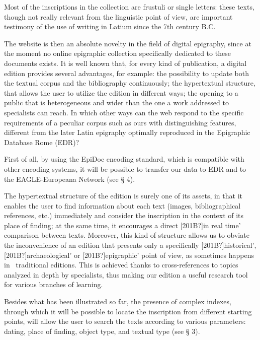 \documentclass[amsthm,ebook]{saparticle}
\begin{document}
Most of the inscriptions in the collection are frustuli or single letters: these texts, though not really relevant from
the linguistic point of view, are important testimony of the use of writing in Latium since the 7th century B.C. 

The website is then an absolute novelty in the field of digital epigraphy, since at the moment no online epigraphic
collection specifically dedicated to these documents exists. It is well known that, for every kind of publication, a
digital edition provides several advantages, for example: the possibility to update both the textual corpus and the
bibliography continuously; the hypertextual structure, that allows the user to utilize the edition in different ways;
the opening to a public that is heterogeneous and wider than the one a work addressed to specialists can reach. In
which other ways can the web respond to the specific requirements of a peculiar corpus such as ours with distinguishing
features, different from the later Latin epigraphy optimally reproduced in the Epigraphic Database Rome (EDR)?

First of all, by using the EpiDoc encoding standard, which is compatible with other encoding systems, it will be
possible to transfer our data to EDR and to the EAGLE-Europeana Network (see § 4).

The hypertextual structure of the edition is surely one of its assets, in that it enables the user to find information
about each text (images, bibliographical references, etc.) immediately and consider the inscription in the context of
its place of finding; at the same time, it encourages a direct [201B?]in real time’ comparison between texts. Moreover,
this kind of structure allows us to obviate the inconvenience of an edition that presents only a specifically
[201B?]historical’, [201B?]archaeological’ or [201B?]epigraphic’ point of view, as sometimes happens in \ traditional
editions. This is achieved thanks to cross-references to topics analyzed in depth by specialists, thus making our
edition a useful research tool for various branches of learning.

Besides what has been illustrated so far, the presence of complex indexes, through which it will be possible to locate
the inscription from different starting points, will allow the user to search the texts according to various
parameters: dating, place of finding, object type, and textual type (see § 3). 
\end{document}
